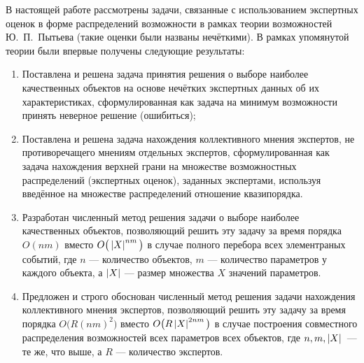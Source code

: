 
В настоящей работе рассмотрены задачи, связанные с  использованием экспертных оценок в форме распределений возможности в рамках теории возможностей Ю.~П.~Пытьева (такие оценки были названы нечёткими). В рамках упомянутой теории были впервые получены следующие результаты:
\begin{enumerate}
\item
Поставлена и решена задача принятия решения о выборе наиболее качественных объектов на основе нечётких экспертных данных об их характеристиках, сформулированная как задача на минимум возможности принять неверное решение (ошибиться);
\item
Поставлена и решена задача нахождения коллективного мнения экспертов, не противоречащего мнениям отдельных экспертов, сформулированная как задача нахождения верхней грани на множестве возможностных распределений (экспертных оценок), заданных экспертами, используя введённое на множестве распределений отношение квазипорядка.
\item 
Разработан численный метод решения задачи о выборе наиболее качественных объектов, %
позволяющий решить эту задачу за время порядка $O(nm)$ вместо $O\big(\left| X \right|^{nm}\big)$ в случае полного перебора всех элементраных событий, где $n$ --- количество объектов, $m$ --- количество параметров у каждого объекта, а $\left| X \right|$ --- размер множества $X$ значений параметров.
 \item
Предложен и строго обоснован численный метод решения задачи нахождения коллективного мнения экспертов, позволяющий решить эту задачу за время порядка $O\big(R(nm)^2\big)$ вместо $O\big(R\left| X \right|^{2nm}\big)$ в случае построения совместного распределения возможностей всех параметров всех объектов, где $n,m,\left| X \right|$~--- те же, что выше, а $R$ --- количество экспертов. %
\end{enumerate}
